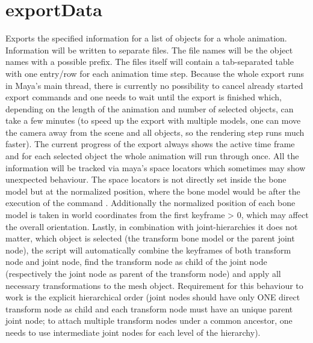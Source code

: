 \documentclass[letterpaper,10pt,english]{sphinxmanual}
\begin{document}
\section{exportData}
\label{pk_src.exportData:exportdata}\label{pk_src.exportData::doc}\label{pk_src.exportData:id1}
{\hyperref[index:commands]{}}
\label{pk_src.exportData:module-pk_src.exportData}
Exports the specified information for a list of objects for a whole animation. Information will be written to separate files. The file names will be the object names with a possible prefix. The files itself will contain a tab-separated table with one entry/row for each animation time step. Because the whole export runs in Maya's main thread, there is currently no possibility to cancel already started export commands and one needs to wait until the export is finished which, depending on the length of the animation and number of selected objects, can take a few minutes (to speed up the export with multiple models, one can move the camera away from the scene and all objects, so the rendering step runs much faster). The current progress of the export always shows the active time frame and for each selected object the whole animation will run through once.
All the information will be tracked via maya's space locators which sometimes may show unexpected behaviour. The space locators is not directly set inside the bone model but at the normalized position, where the bone model would be after the execution of the command {\hyperref[pk_src.normalize:normalize]{}}. Additionally the normalized position of each bone model is taken in world coordinates from the first keyframe \textgreater{} 0, which may affect the overall orientation. Lastly, in combination with joint-hierarchies it does not matter, which object is selected (the transform bone model or the parent joint node), the script will automatically combine the keyframes of both transform node and joint node, find the transform node as child of the joint node (respectively the joint node as parent of the transform node) and apply all necessary transformations to the mesh object. Requirement for this behaviour to work is the explicit hierarchical order (joint nodes should have only ONE direct transform node as child and each transform node must have an unique parent joint node; to attach multiple transform nodes under a common ancestor, one needs to use intermediate joint nodes for each level of the hierarchy).
\end{document}
